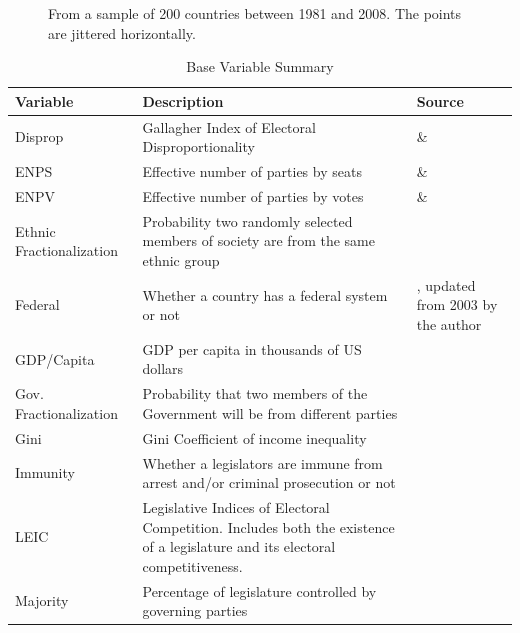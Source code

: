 \documentclass[a4paper]{article}\usepackage{graphicx, color}
\newenvironment{knitrout}{}{} %
\begin{document}
{{\begin{figure}[t]
\begin{center}
\begin{knitrout}
\end{knitrout}

    \end{center}
    \begin{singlespace}
        {\scriptsize{From a sample of 200 countries between 1981 and 2008. The points are jittered horizontally.}}
    \end{singlespace}

\end{figure}

\begin{table}[!h]
    \begin{center}
    \caption{Base Variable Summary}
    \label{var_summary}
    \begin{tabular}{l m{7cm} m{3.5cm}}

            \hline
            Variable & Description & Source \\
            \hline \hline
            Disprop & Gallagher Index of Electoral Disproportionality & \cite{Gallagher2012} \& \cite{Carey2011} \\
            ENPS & Effective number of parties by seats & \cite{Gallagher2012} \& \cite{Carey2011} \\
            ENPV & Effective number of parties by votes & \cite{Gallagher2012} \& \cite{Carey2011} \\
            Ethnic Fractionalization & Probability two randomly selected members of society are from the same ethnic group & \cite{Alesina2003} \\
            Federal & Whether a country has a federal system or not & \cite{Carey2011}, updated from 2003 by the author \\           
            GDP/Capita & GDP per capita in thousands of US dollars & \cite{WorldBank2011} \\
            Gov. Fractionalization & Probability that two members of the Government will be from different parties & \cite{DPI2001} \\
            Gini & Gini Coefficient of income inequality & \cite{UNU2008} \\
            Immunity & Whether a legislators are immune from arrest and/or criminal prosecution or not & \cite{Fish2009} \\
            LEIC & Legislative Indices of Electoral Competition. Includes both the existence of a legislature and its electoral competitiveness. & \cite{DPI2001} \\
            Majority & Percentage of legislature controlled by governing parties & \cite{DPI2001} \\

\end{tabular}
\end{center}
\end{table}}}
\end{document}
